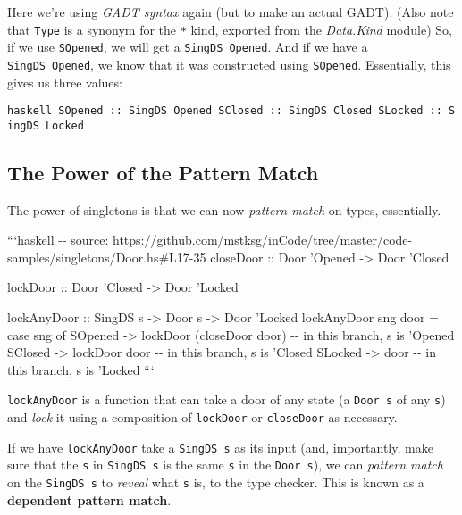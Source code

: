\documentclass[]{article}
\begin{document}
Here we're using \emph{GADT syntax} again (but to make an actual GADT). (Also
note that \texttt{Type} is a synonym for the \texttt{*} kind, exported from the
\emph{Data.Kind} module) So, if we use \texttt{SOpened}, we will get a
\texttt{SingDS\ \textquotesingle{}Opened}. And if we have a
\texttt{SingDS\ \textquotesingle{}Opened}, we know that it was constructed using
\texttt{SOpened}. Essentially, this gives us three values:

\texttt{haskell\ SOpened\ ::\ SingDS\ \textquotesingle{}Opened\ SClosed\ ::\ SingDS\ \textquotesingle{}Closed\ SLocked\ ::\ SingDS\ \textquotesingle{}Locked}

\subsection{The Power of the Pattern Match}

The power of singletons is that we can now \emph{pattern match} on types,
essentially.

```haskell -\/- source:
https://github.com/mstksg/inCode/tree/master/code-samples/singletons/Door.hs\#L17-35
closeDoor :: Door 'Opened -\textgreater{} Door 'Closed

lockDoor :: Door 'Closed -\textgreater{} Door 'Locked

lockAnyDoor :: SingDS s -\textgreater{} Door s -\textgreater{} Door 'Locked
lockAnyDoor sng door = case sng of SOpened -\textgreater{} lockDoor (closeDoor
door) -\/- in this branch, s is 'Opened SClosed -\textgreater{} lockDoor door
-\/- in this branch, s is 'Closed SLocked -\textgreater{} door -\/- in this
branch, s is 'Locked ```

\texttt{lockAnyDoor} is a function that can take a door of any state (a
\texttt{Door\ s} of any \texttt{s}) and \emph{lock} it using a composition of
\texttt{lockDoor} or \texttt{closeDoor} as necessary.

If we have \texttt{lockAnyDoor} take a \texttt{SingDS\ s} as its input (and,
importantly, make sure that the \texttt{s} in \texttt{SingDS\ s} is the same
\texttt{s} in the \texttt{Door\ s}), we can \emph{pattern match} on the
\texttt{SingDS\ s} to \emph{reveal} what \texttt{s} is, to the type checker.
This is known as a \textbf{dependent pattern match}.
\end{document}
